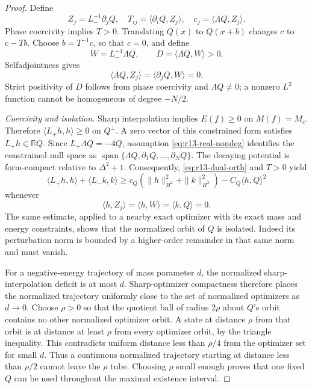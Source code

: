 \begin{proof}
Define
\[
 Z_j=L_-^{-1}\partial_jQ,\quad
 T_{ij}=\langle\partial_iQ,Z_j\rangle,\quad
 c_j=\langle\Lambda Q,Z_j\rangle.
\]
Phase coercivity implies $T>0$. Translating $Q(x)$ to $Q(x+b)$ changes
$c$ to $c-Tb$. Choose $b=T^{-1}c$, so that $c=0$, and define
\[
 W=L_-^{-1}\Lambda Q,\qquad D=\langle\Lambda Q,W\rangle>0.
\]
Selfadjointness gives
\begin{equation}\label{eq:r13-dual-orth}
 \langle\Lambda Q,Z_j\rangle=
 \langle\partial_jQ,W\rangle=0.
\end{equation}
Strict positivity of $D$ follows from phase coercivity and
$\Lambda Q\ne0$; a nonzero $L^2$ function cannot be homogeneous of
degree $-N/2$.

\emph{Coercivity and isolation.}
Sharp interpolation implies $E(f)\ge0$ on $M(f)=M_c$. Therefore
$\langle L_+h,h\rangle\ge0$ on $Q^\perp$. A zero vector of this
constrained form satisfies $L_+h\in\mathbb RQ$. Since
$L_+\Lambda Q=-4Q$, assumption \eqref{eq:r13-real-nondeg} identifies
the constrained null space as
$\operatorname{span}\{\Lambda Q,\partial_1Q,\ldots,\partial_NQ\}$.
The decaying potential is form-compact relative to $\Delta^2+1$.
Consequently, \eqref{eq:r13-dual-orth} and $T>0$ yield
\begin{equation}\label{eq:r13-constrained-coercivity}
 \langle L_+h,h\rangle+\langle L_-k,k\rangle
 \ge c_Q(\|h\|_{H^2}^2+\|k\|_{H^2}^2)
       -C_Q\langle h,Q\rangle^2
\end{equation}
whenever
\begin{equation}\label{eq:r13-gauges}
 \langle h,Z_j\rangle=\langle h,W\rangle=
 \langle k,Q\rangle=0.
\end{equation}
The same estimate, applied to a nearby exact optimizer with its exact
mass and energy constraints, shows that the normalized orbit of $Q$
is isolated. Indeed its perturbation norm is bounded by a higher-order
remainder in that same norm and must vanish.

For a negative-energy trajectory of mass parameter $d$, the normalized
sharp-interpolation deficit is at most $d$. Sharp-optimizer compactness
therefore places the normalized trajectory uniformly close to the set
of normalized optimizers as $d\to0$. Choose $\rho>0$ so that the
quotient ball of radius $2\rho$ about $Q$'s orbit contains no other
normalized optimizer orbit. A state at distance $\rho$ from that orbit
is at distance at least $\rho$ from every optimizer orbit, by the
triangle inequality. This contradicts uniform distance less than
$\rho/4$ from the optimizer set for small $d$. Thus a continuous
normalized trajectory starting at distance less than $\rho/2$ cannot
leave the $\rho$ tube. Choosing $\rho$ small enough proves that one
fixed $Q$ can be used throughout the maximal existence interval.


\end{proof}
